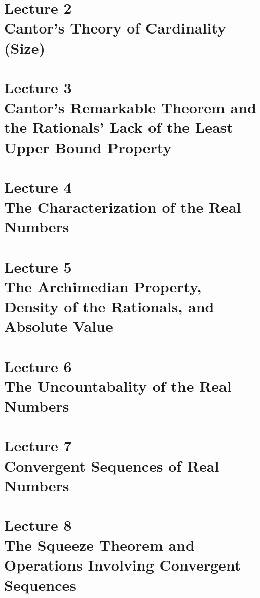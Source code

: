\documentclass{article}
\begin{document}
\section[ Cantor's Theory of Cardinality (Size)]{Lecture 2 \\ {\normalsize Cantor's Theory of Cardinality (Size)}}  \newpage 
\section[Cantor's Remarkable Theorem and the Rationals' Lack of the Least Upper Bound Property]{Lecture 3 \\ {\normalsize Cantor's Remarkable Theorem and the Rationals' Lack of the Least Upper Bound Property}}  \newpage 
\section[The Characterization of the Real Numbers]{Lecture 4 \\ {\normalsize The Characterization of the Real Numbers}} \newpage 
\section[The Archimedian Property, Density of the Rationals, and Absolute Value]{Lecture 5 \\ {\normalsize The Archimedian Property, Density of the Rationals, and Absolute Value}}  \newpage 
\section[The Uncountabality of the Real Numbers]{Lecture 6 \\ {\normalsize The Uncountabality of the Real Numbers}} \newpage 
\section[Convergent Sequences of Real Numbers]{Lecture 7 \\ {\normalsize 	Convergent Sequences of Real Numbers}} \newpage 
\section[The Squeeze Theorem and Operations Involving Convergent Sequences]{Lecture 8 \\ {\normalsize 	The Squeeze Theorem and Operations Involving Convergent Sequences}} \newpage 
\end{document}
